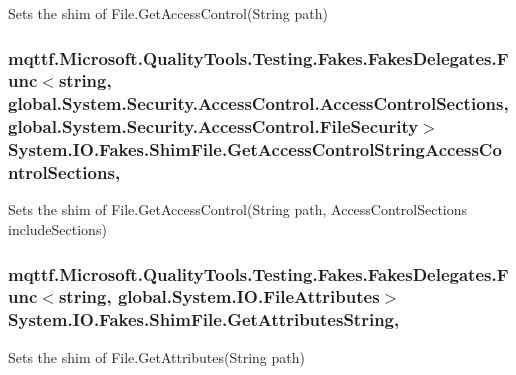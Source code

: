 Sets the shim of File.\-Get\-Access\-Control(\-String path)

\hypertarget{class_system_1_1_i_o_1_1_fakes_1_1_shim_file_a3a41e935bdfc8f3202d7e793f7cf929e}{
\subsubsection[{Get\-Access\-Control\-String\-Access\-Control\-Sections}]{\setlength{\rightskip}{0pt plus 5cm}mqttf.\-Microsoft.\-Quality\-Tools.\-Testing.\-Fakes.\-Fakes\-Delegates.\-Func$<$string, global.\-System.\-Security.\-Access\-Control.\-Access\-Control\-Sections, global.\-System.\-Security.\-Access\-Control.\-File\-Security$>$ System.\-I\-O.\-Fakes.\-Shim\-File.\-Get\-Access\-Control\-String\-Access\-Control\-Sections\hspace{0.3cm}{\ttfamily [static]}, {\ttfamily [set]}}}\label{class_system_1_1_i_o_1_1_fakes_1_1_shim_file_a3a41e935bdfc8f3202d7e793f7cf929e}


Sets the shim of File.\-Get\-Access\-Control(\-String path, Access\-Control\-Sections include\-Sections)

\hypertarget{class_system_1_1_i_o_1_1_fakes_1_1_shim_file_a98ebec2ff6d6c3b80b939b1107235056}{
\subsubsection[{Get\-Attributes\-String}]{\setlength{\rightskip}{0pt plus 5cm}mqttf.\-Microsoft.\-Quality\-Tools.\-Testing.\-Fakes.\-Fakes\-Delegates.\-Func$<$string, global.\-System.\-I\-O.\-File\-Attributes$>$ System.\-I\-O.\-Fakes.\-Shim\-File.\-Get\-Attributes\-String\hspace{0.3cm}{\ttfamily [static]}, {\ttfamily [set]}}}\label{class_system_1_1_i_o_1_1_fakes_1_1_shim_file_a98ebec2ff6d6c3b80b939b1107235056}


Sets the shim of File.\-Get\-Attributes(\-String path)

